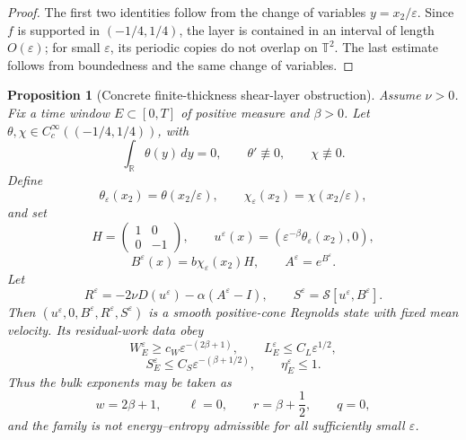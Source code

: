 \documentclass[11pt]{article}
\numberwithin{equation}{section}
\newtheorem{proposition}[theorem]{Proposition}
\newcommand{\T}{\mathbb T}
\newcommand{\R}{\mathbb R}
\newcommand{\Id}{I}
\newcommand{\eps}{\varepsilon}
\begin{document}
\begin{proof}
The first two identities follow from the change of variables
\(y=x_2/\eps\).  Since \(f\) is supported in \((-1/4,1/4)\), the layer is
contained in an interval of length \(O(\eps)\); for small \(\eps\), its
periodic copies do not overlap on \(\T^2\).  The last estimate follows from
boundedness and the same change of variables.
\end{proof}

\begin{proposition}[Concrete finite-thickness shear-layer obstruction]
\label{prop:concrete-layer}
Assume \(\nu>0\).  Fix a time window \(E\subset[0,T]\) of positive measure and
\(\beta>0\).  Let \(\theta,\chi\in C_c^\infty((-1/4,1/4))\), with
\[
  \int_{\R}\theta(y)\,dy=0,\qquad \theta'\not\equiv0,\qquad \chi\not\equiv0.
\]
Define
\[
  \theta_\varepsilon(x_2)=\theta(x_2/\varepsilon),\qquad
  \chi_\varepsilon(x_2)=\chi(x_2/\varepsilon),
\]
and set
\[
  H=\begin{pmatrix}1&0\\0&-1\end{pmatrix},\qquad
  u^\varepsilon(x)=
  \left(\varepsilon^{-\beta}\theta_\varepsilon(x_2),0\right),
\]
\[
  B^\varepsilon(x)=b\chi_\varepsilon(x_2)H,\qquad
  A^\varepsilon=e^{B^\varepsilon}.
\]
Let
\[
  R^\varepsilon=-2\nu D(u^\varepsilon)-\alpha(A^\varepsilon-\Id),
  \qquad
  S^\varepsilon=\mathcal S[u^\varepsilon,B^\varepsilon].
  \label{eq:concrete-defects}
\]
Then
\((u^\varepsilon,0,B^\varepsilon,R^\varepsilon,S^\varepsilon)\) is a smooth
positive-cone Reynolds state with fixed mean velocity.  Its residual-work data
obey
\[
  W_E^\varepsilon\ge c_W\varepsilon^{-(2\beta+1)},\qquad
  L_E^\varepsilon\le C_L\varepsilon^{1/2},
\]
\[
  S_E^\varepsilon\le C_S\varepsilon^{-(\beta+1/2)},\qquad
  \eta_E^\varepsilon\le1 .
\]
Thus the bulk exponents may be taken as
\[
  w=2\beta+1,\qquad \ell=0,\qquad r=\beta+\frac12,\qquad q=0,
\]
and the family is not energy--entropy admissible for all sufficiently small
\(\varepsilon\).
\end{proposition}
\end{document}
